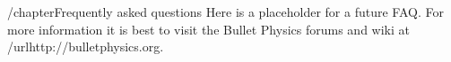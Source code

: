 
/chapter{Frequently asked questions}
Here is a placeholder for a future FAQ. For more information it is best to visit the Bullet Physics forums and wiki at /url{http://bulletphysics.org}.
